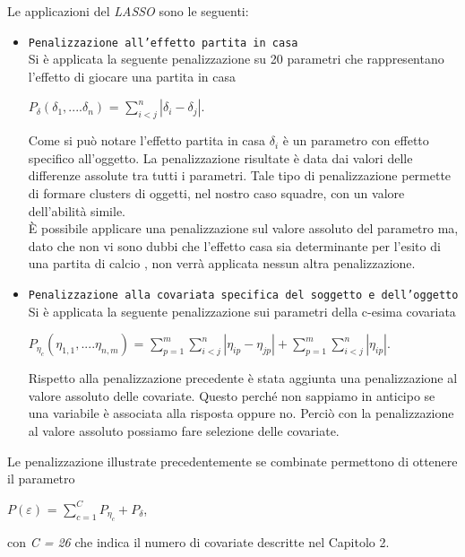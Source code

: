Le applicazioni del \emph{LASSO} sono le seguenti:
\begin{itemize}
	\item \texttt{Penalizzazione all'effetto partita in casa}\\
	Si è applicata la seguente penalizzazione su 20 parametri che rappresentano l'effetto di giocare una partita in casa
	\begin{center}
		$ P_{\delta}(\delta_1,....\delta_n)$ = $\sum^{n}_{i<j}|\delta_i - \delta_j|$.
	\end{center}
	Come si può notare l'effetto partita in casa $\delta_i$ è un parametro con effetto specifico all'oggetto. La penalizzazione risultate è data dai valori delle differenze assolute tra tutti i parametri. Tale tipo di penalizzazione permette di formare clusters di oggetti, nel nostro caso squadre, con un valore dell'abilità simile.\\
	È possibile applicare una penalizzazione sul valore assoluto del parametro ma, dato che non vi sono dubbi che l'effetto casa sia determinante per l'esito di una partita di calcio \autocite{lago2016home}, non verrà applicata nessun altra penalizzazione.
	\item \texttt{Penalizzazione alla covariata specifica del soggetto e dell'oggetto}\\
	Si è applicata la seguente penalizzazione sui parametri della c-esima covariata 
	\begin{center}
		$ P_{\eta_{c}}(\eta_{1,1},....\eta_{n,m})$ = $\sum^{m}_{p=1}\sum^{n}_{i<j}|\eta_{ip} - \eta_{jp}| + \sum^{m}_{p=1}\sum^{n}_{i<j}|\eta_{ip}|$.
	\end{center}
	Rispetto alla penalizzazione precedente è stata aggiunta una penalizzazione al valore assoluto delle covariate. Questo perché non sappiamo in anticipo se una variabile è associata alla risposta oppure no. Perciò con la penalizzazione al valore assoluto possiamo fare selezione delle covariate.\\
\end{itemize}

Le penalizzazione illustrate precedentemente se combinate permettono di ottenere il parametro 
\begin{center}
	$ P(\varepsilon)$ = $\sum_{c=1}^{C}P_{\eta_c} + P_{\delta}$,
	
\end{center}
con \emph{C = 26} che indica il numero di covariate descritte nel Capitolo 2.



